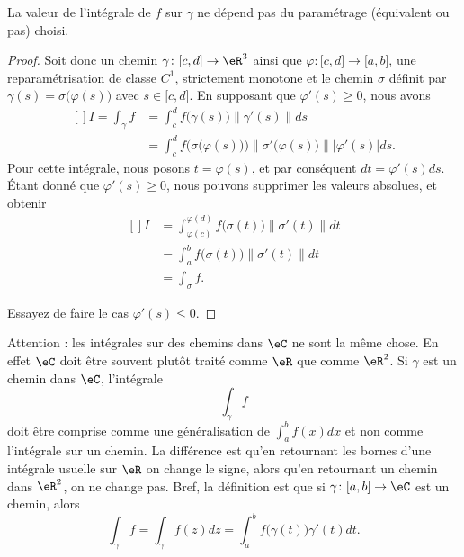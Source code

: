 \begin{proposition}
    La valeur de l'intégrale de $f$ sur $\gamma$ ne dépend pas du paramétrage (équivalent ou pas) choisi.
\end{proposition}

\begin{proof}
    Soit donc un chemin \( \gamma\colon \mathopen[ c , d \mathclose]\to \eR^3\) ainsi que $\varphi\colon \mathopen[ c , d \mathclose]\to \mathopen[ a , b \mathclose]$, une reparamétrisation de classe $C^1$, strictement monotone et le chemin \( \sigma\) définit par $\gamma(s)=\sigma\big( \varphi(s) \big)$ avec $s\in\mathopen[ c , d \mathclose]$. En supposant que $\varphi'(s)\geq 0$, nous avons
    \begin{equation}
        \begin{aligned}[]
            I=\int_{\gamma}f&=\int_c^df\big( \gamma(s) \big)\| \gamma'(s) \|ds\\
            &=\int_c^df\Big( \sigma\big( \varphi(s) \big) \Big)\| \sigma'\big( \varphi(s) \big) \| |\varphi'(s) |ds.
        \end{aligned}
    \end{equation}
    Pour cette intégrale, nous posons $t=\varphi(s)$, et par conséquent $dt=\varphi'(s)ds$. Étant donné que $\varphi'(s)\geq 0$, nous pouvons supprimer les valeurs absolues, et obtenir
    \begin{equation}
        \begin{aligned}[]
            I&=\int_{\varphi(c)}^{\varphi(d)}f\big( \sigma(t) \big)\| \sigma'(t) \|dt\\
            &=\int_a^bf\big( \sigma(t) \big)\| \sigma'(t) \|dt\\
            &=\int_{\sigma}f.
        \end{aligned}
    \end{equation}

    Essayez de faire le cas $\varphi'(s)\leq 0$.
\end{proof}

\begin{remark}      \label{RemiqswPd}
    Attention : les intégrales sur des chemins dans \( \eC\) ne sont la même chose. En effet \( \eC\) doit être souvent plutôt traité comme \( \eR\) que comme \( \eR^2\). Si \( \gamma\) est un chemin dans \( \eC\), l'intégrale
    \begin{equation}
        \int_{\gamma}f
    \end{equation}
    doit être comprise comme une généralisation de \( \int_a^bf(x)dx\) et non comme l'intégrale sur un chemin. La différence est qu'en retournant les bornes d'une intégrale usuelle sur \( \eR\) on change le signe, alors qu'en retournant un chemin dans \( \eR^2\), on ne change pas. Bref, la définition est que si \( \gamma\colon \mathopen[ a , b \mathclose]\to \eC\) est un chemin, alors
    \begin{equation}
        \int_{\gamma}f=\int_{\gamma}f(z)dz=\int_a^bf\big( \gamma(t) \big)\gamma'(t)dt.
    \end{equation}
\end{remark}

